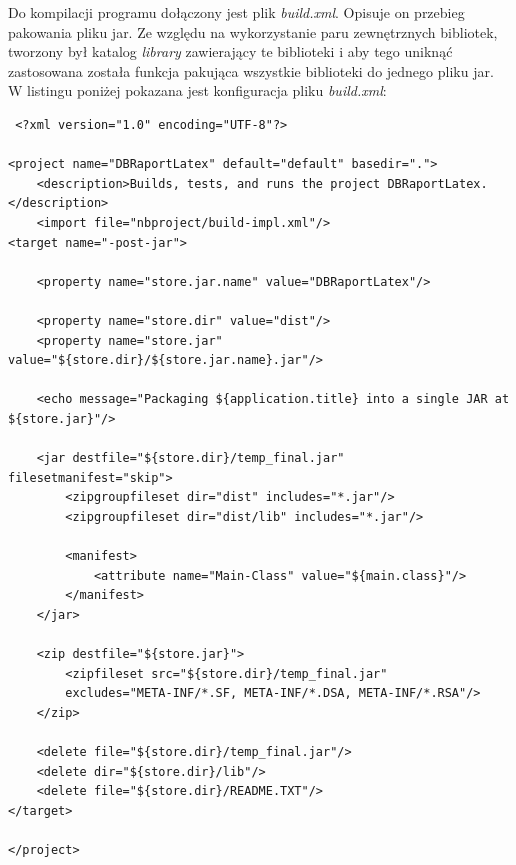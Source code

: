 Do kompilacji programu dołączony jest plik \emph{build.xml}. Opisuje on przebieg pakowania pliku jar. Ze względu na wykorzystanie paru zewnętrznych bibliotek, tworzony był katalog \emph{library} zawierający te biblioteki i aby tego uniknąć zastosowana została funkcja pakująca wszystkie biblioteki do jednego pliku jar. W listingu poniżej pokazana jest konfiguracja pliku \emph{build.xml}:

 \begin{lstlisting}
 <?xml version="1.0" encoding="UTF-8"?>

<project name="DBRaportLatex" default="default" basedir=".">
    <description>Builds, tests, and runs the project DBRaportLatex.</description>
    <import file="nbproject/build-impl.xml"/>
<target name="-post-jar">

    <property name="store.jar.name" value="DBRaportLatex"/>

    <property name="store.dir" value="dist"/>
    <property name="store.jar" value="${store.dir}/${store.jar.name}.jar"/>

    <echo message="Packaging ${application.title} into a single JAR at ${store.jar}"/>

    <jar destfile="${store.dir}/temp_final.jar" filesetmanifest="skip">
        <zipgroupfileset dir="dist" includes="*.jar"/>
        <zipgroupfileset dir="dist/lib" includes="*.jar"/>

        <manifest>
            <attribute name="Main-Class" value="${main.class}"/>
        </manifest>
    </jar>

    <zip destfile="${store.jar}">
        <zipfileset src="${store.dir}/temp_final.jar"
        excludes="META-INF/*.SF, META-INF/*.DSA, META-INF/*.RSA"/>
    </zip>

    <delete file="${store.dir}/temp_final.jar"/>
    <delete dir="${store.dir}/lib"/>
    <delete file="${store.dir}/README.TXT"/>
</target>
  
</project>
\end{lstlisting}


